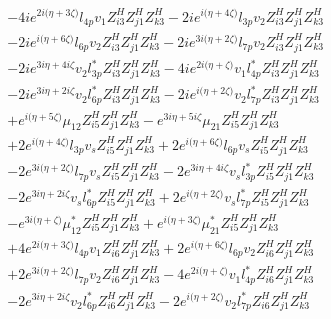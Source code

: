 \begin{align}
 &-4 i e^{2 i \Big(\eta +3 \zeta \Big)} l_{4p} v_1 Z_{{i 3}}^{H} Z_{{j 1}}^{H} Z_{{k 3}}^{H} -2 i e^{i \Big(\eta +4 \zeta \Big)} l_{3p} v_2 Z_{{i 3}}^{H} Z_{{j 1}}^{H} Z_{{k 3}}^{H} \nonumber \\ 
 &-2 i e^{i \Big(\eta +6 \zeta \Big)} l_{6p} v_2 Z_{{i 3}}^{H} Z_{{j 1}}^{H} Z_{{k 3}}^{H} -2 i e^{3 i \Big(\eta +2 \zeta \Big)} l_{7p} v_2 Z_{{i 3}}^{H} Z_{{j 1}}^{H} Z_{{k 3}}^{H} \nonumber \\ 
 &-2 i e^{3 i \eta +4 i \zeta } v_2 l_{3p}^* Z_{{i 3}}^{H} Z_{{j 1}}^{H} Z_{{k 3}}^{H} -4 i e^{2 i \Big(\eta +\zeta \Big)} v_1 l_{4p}^* Z_{{i 3}}^{H} Z_{{j 1}}^{H} Z_{{k 3}}^{H} \nonumber \\ 
 &-2 i e^{3 i \eta +2 i \zeta } v_2 l_{6p}^* Z_{{i 3}}^{H} Z_{{j 1}}^{H} Z_{{k 3}}^{H} -2 i e^{i \Big(\eta +2 \zeta \Big)} v_2 l_{7p}^* Z_{{i 3}}^{H} Z_{{j 1}}^{H} Z_{{k 3}}^{H} \nonumber \\ 
 &+e^{i \Big(\eta +5 \zeta \Big)} \mu_{12} Z_{{i 5}}^{H} Z_{{j 1}}^{H} Z_{{k 3}}^{H} - e^{3 i \eta +5 i \zeta } \mu_{21} Z_{{i 5}}^{H} Z_{{j 1}}^{H} Z_{{k 3}}^{H} \nonumber \\ 
 &+2 e^{i \Big(\eta +4 \zeta \Big)} l_{3p} v_s Z_{{i 5}}^{H} Z_{{j 1}}^{H} Z_{{k 3}}^{H} +2 e^{i \Big(\eta +6 \zeta \Big)} l_{6p} v_s Z_{{i 5}}^{H} Z_{{j 1}}^{H} Z_{{k 3}}^{H} \nonumber \\ 
 &-2 e^{3 i \Big(\eta +2 \zeta \Big)} l_{7p} v_s Z_{{i 5}}^{H} Z_{{j 1}}^{H} Z_{{k 3}}^{H} -2 e^{3 i \eta +4 i \zeta } v_s l_{3p}^* Z_{{i 5}}^{H} Z_{{j 1}}^{H} Z_{{k 3}}^{H} \nonumber \\ 
 &-2 e^{3 i \eta +2 i \zeta } v_s l_{6p}^* Z_{{i 5}}^{H} Z_{{j 1}}^{H} Z_{{k 3}}^{H} +2 e^{i \Big(\eta +2 \zeta \Big)} v_s l_{7p}^* Z_{{i 5}}^{H} Z_{{j 1}}^{H} Z_{{k 3}}^{H} \nonumber \\ 
 &- e^{3 i \Big(\eta +\zeta \Big)} \mu_{12}^* Z_{{i 5}}^{H} Z_{{j 1}}^{H} Z_{{k 3}}^{H} +e^{i \Big(\eta +3 \zeta \Big)} \mu_{21}^* Z_{{i 5}}^{H} Z_{{j 1}}^{H} Z_{{k 3}}^{H} \nonumber \\ 
 &+4 e^{2 i \Big(\eta +3 \zeta \Big)} l_{4p} v_1 Z_{{i 6}}^{H} Z_{{j 1}}^{H} Z_{{k 3}}^{H} +2 e^{i \Big(\eta +6 \zeta \Big)} l_{6p} v_2 Z_{{i 6}}^{H} Z_{{j 1}}^{H} Z_{{k 3}}^{H} \nonumber \\ 
 &+2 e^{3 i \Big(\eta +2 \zeta \Big)} l_{7p} v_2 Z_{{i 6}}^{H} Z_{{j 1}}^{H} Z_{{k 3}}^{H} -4 e^{2 i \Big(\eta +\zeta \Big)} v_1 l_{4p}^* Z_{{i 6}}^{H} Z_{{j 1}}^{H} Z_{{k 3}}^{H} \nonumber \\ 
 &-2 e^{3 i \eta +2 i \zeta } v_2 l_{6p}^* Z_{{i 6}}^{H} Z_{{j 1}}^{H} Z_{{k 3}}^{H} -2 e^{i \Big(\eta +2 \zeta \Big)} v_2 l_{7p}^* Z_{{i 6}}^{H} Z_{{j 1}}^{H} Z_{{k 3}}^{H} \nonumber \\ 

\end{align}
